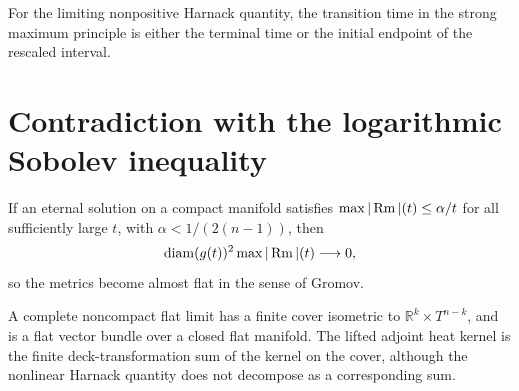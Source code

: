 \begin{theorem}
\label{ex:chow-iii-entropy-rigidity-alternatives}
For the limiting nonpositive Harnack quantity, the transition time in the
strong maximum principle is either the terminal time or the initial endpoint
of the rescaled interval.
\end{theorem}

\section{Contradiction with the logarithmic Sobolev inequality}

\begin{lemma}
\label{lem:chow-iii-type-iii-curvature-gap}
If an eternal solution on a compact manifold satisfies
\(\max|\operatorname{Rm}|(t)\le\alpha/t\) for all sufficiently large \(t\), with
\(\alpha<1/(2(n-1))\), then
\[
\operatorname{diam}(g(t))^2\max|\operatorname{Rm}|(t)\longrightarrow0,
\]
so the metrics become almost flat in the sense of Gromov.
\end{lemma}

\begin{remark}
\label{rem:chow-iii-flat-limit-cover}
A complete noncompact flat limit has a finite cover isometric to
\(\mathbb R^k\times T^{n-k}\), and is a flat vector bundle over a closed flat
manifold.  The lifted adjoint heat kernel is the finite deck-transformation sum
of the kernel on the cover, although the nonlinear Harnack quantity does not
decompose as a corresponding sum.
\end{remark}

